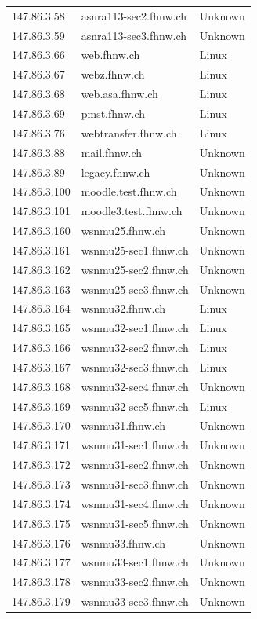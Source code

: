 \documentclass[11pt,a4paper]{scrartcl}
\begin{document}
\begin{longtable}{p{2.5cm}|p{8cm}|l}
	147.86.3.58 & asnra113-sec2.fhnw.ch & Unknown\\
	147.86.3.59 & asnra113-sec3.fhnw.ch & Unknown\\
	147.86.3.66 & web.fhnw.ch & Linux\\
	147.86.3.67 & webz.fhnw.ch & Linux\\
	147.86.3.68 & web.asa.fhnw.ch & Linux\\
	147.86.3.69 & pmst.fhnw.ch & Linux\\
	147.86.3.76 & webtransfer.fhnw.ch & Linux\\
	147.86.3.88 & mail.fhnw.ch & Unknown\\
	147.86.3.89 & legacy.fhnw.ch & Unknown\\
	147.86.3.100 & moodle.test.fhnw.ch & Unknown\\
	147.86.3.101 & moodle3.test.fhnw.ch & Unknown\\
	147.86.3.160 & wsnmu25.fhnw.ch & Unknown\\
	147.86.3.161 & wsnmu25-sec1.fhnw.ch & Unknown\\
	147.86.3.162 & wsnmu25-sec2.fhnw.ch & Unknown\\
	147.86.3.163 & wsnmu25-sec3.fhnw.ch & Unknown\\
	147.86.3.164 & wsnmu32.fhnw.ch & Linux\\
	147.86.3.165 & wsnmu32-sec1.fhnw.ch & Linux\\
	147.86.3.166 & wsnmu32-sec2.fhnw.ch & Linux\\
	147.86.3.167 & wsnmu32-sec3.fhnw.ch & Linux\\
	147.86.3.168 & wsnmu32-sec4.fhnw.ch & Unknown\\
	147.86.3.169 & wsnmu32-sec5.fhnw.ch & Linux\\
	147.86.3.170 & wsnmu31.fhnw.ch & Unknown\\
	147.86.3.171 & wsnmu31-sec1.fhnw.ch & Unknown\\
	147.86.3.172 & wsnmu31-sec2.fhnw.ch & Unknown\\
	147.86.3.173 & wsnmu31-sec3.fhnw.ch & Unknown\\
	147.86.3.174 & wsnmu31-sec4.fhnw.ch & Unknown\\
	147.86.3.175 & wsnmu31-sec5.fhnw.ch & Unknown\\
	147.86.3.176 & wsnmu33.fhnw.ch & Unknown\\
	147.86.3.177 & wsnmu33-sec1.fhnw.ch & Unknown\\
	147.86.3.178 & wsnmu33-sec2.fhnw.ch & Unknown\\
	147.86.3.179 & wsnmu33-sec3.fhnw.ch & Unknown\\

\end{longtable}
\end{document}
